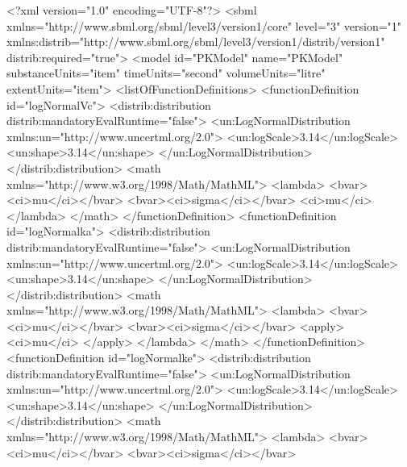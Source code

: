 \documentclass[draftspec]{sbmlpkgspec}
\begin{document}
\begin{example}
<?xml version="1.0" encoding="UTF-8"?>
<sbml xmlns="http://www.sbml.org/sbml/level3/version1/core" level="3" version="1"
    xmlns:distrib="http://www.sbml.org/sbml/level3/version1/distrib/version1" 
    distrib:required="true">
    <model id="PKModel" name="PKModel" substanceUnits="item"
          timeUnits="second" volumeUnits="litre" extentUnits="item">
        <listOfFunctionDefinitions>
            <functionDefinition id="logNormalVc">
                <distrib:distribution distrib:mandatoryEvalRuntime="false">
                    <un:LogNormalDistribution xmlns:un="http://www.uncertml.org/2.0">
                        <un:logScale>3.14</un:logScale>
                        <un:shape>3.14</un:shape>
                    </un:LogNormalDistribution>
                </distrib:distribution>
                <math xmlns="http://www.w3.org/1998/Math/MathML">
                    <lambda>
                        <bvar><ci>mu</ci></bvar>
                        <bvar><ci>sigma</ci></bvar> 
                        <ci>mu</ci>                         
                    </lambda>
                </math>
            </functionDefinition>
            <functionDefinition id="logNormalka">
                <distrib:distribution distrib:mandatoryEvalRuntime="false">
                    <un:LogNormalDistribution xmlns:un="http://www.uncertml.org/2.0">
                        <un:logScale>3.14</un:logScale>
                        <un:shape>3.14</un:shape>
                    </un:LogNormalDistribution>
                </distrib:distribution>
                <math xmlns="http://www.w3.org/1998/Math/MathML">
                    <lambda>
                        <bvar><ci>mu</ci></bvar>
                        <bvar><ci>sigma</ci></bvar> 
                        <apply>
                          <ci>mu</ci>
                        </apply>
                    </lambda>
                </math>
            </functionDefinition>      
            <functionDefinition id="logNormalke">
                <distrib:distribution distrib:mandatoryEvalRuntime="false">
                    <un:LogNormalDistribution xmlns:un="http://www.uncertml.org/2.0">
                        <un:logScale>3.14</un:logScale>
                        <un:shape>3.14</un:shape>
                    </un:LogNormalDistribution>
                </distrib:distribution>
                <math xmlns="http://www.w3.org/1998/Math/MathML">
                    <lambda>
                        <bvar><ci>mu</ci></bvar>
                        <bvar><ci>sigma</ci></bvar> 

\end{example}
\end{document}
